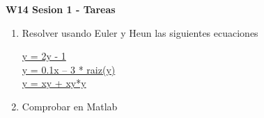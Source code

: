 \documentclass{beamer}
\begin{document}
\begin{frame}


\textbf{W14 Sesion 1 - Tareas}


\begin{enumerate}
\item Resolver usando Euler y Heun las siguientes ecuaciones

 
\href{https://www.youtube.com/watch?v=lob94xNqq0w}{y =  2y - 1} \\

 
\href{https://www.youtube.com/watch?v=RR_VprIzSGM}{y = 0.1x – 3 * raiz(y)} \\


\href{https://www.youtube.com/watch?v=Ja9n0XLm3ww}{y = xy + xy*y}
 

\item
	Comprobar en Matlab


\end{enumerate} 


\end{frame}
\end{document}
